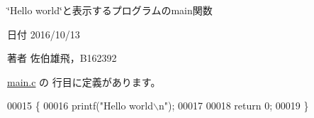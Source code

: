 \char`\"{}\-Hello world\char`\"{}と表示するプログラムのmain関数 

\begin{DoxyDate}{日付}
2016/10/13 
\end{DoxyDate}
\begin{DoxyAuthor}{著者}
佐伯雄飛，\-B162392 
\end{DoxyAuthor}


 \hyperlink{main_8c_source}{main.\-c} の  行目に定義があります。


\begin{DoxyCode}
00015                \{
00016   printf(\textcolor{stringliteral}{"Hello world\(\backslash\)n"});
00017 
00018   \textcolor{keywordflow}{return} 0;
00019 \}
\end{DoxyCode}
